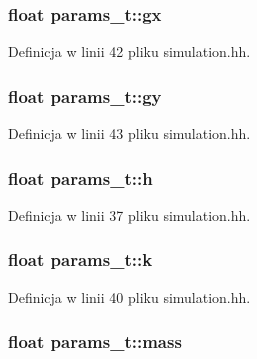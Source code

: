 \subsubsection[{gx}]{\setlength{\rightskip}{0pt plus 5cm}float params\+\_\+t\+::gx}\label{structparams__t_a9f3f70c0cdedcb053c9d45c2e41e67b6}


Definicja w linii 42 pliku simulation.\+hh.

\hypertarget{structparams__t_a0da484b4cc6a542875aa7b92e200f507}{}
\subsubsection[{gy}]{\setlength{\rightskip}{0pt plus 5cm}float params\+\_\+t\+::gy}\label{structparams__t_a0da484b4cc6a542875aa7b92e200f507}


Definicja w linii 43 pliku simulation.\+hh.

\hypertarget{structparams__t_a27d76064f2ae0cb93a0956027cfcc19b}{}
\subsubsection[{h}]{\setlength{\rightskip}{0pt plus 5cm}float params\+\_\+t\+::h}\label{structparams__t_a27d76064f2ae0cb93a0956027cfcc19b}


Definicja w linii 37 pliku simulation.\+hh.

\hypertarget{structparams__t_a97ee2783cf89cee1151be3250e9054b3}{}
\subsubsection[{k}]{\setlength{\rightskip}{0pt plus 5cm}float params\+\_\+t\+::k}\label{structparams__t_a97ee2783cf89cee1151be3250e9054b3}


Definicja w linii 40 pliku simulation.\+hh.

\hypertarget{structparams__t_afe4a59fe43565a71a0a7a155714e2af1}{}
\subsubsection[{mass}]{\setlength{\rightskip}{0pt plus 5cm}float params\+\_\+t\+::mass}\label{structparams__t_afe4a59fe43565a71a0a7a155714e2af1}


